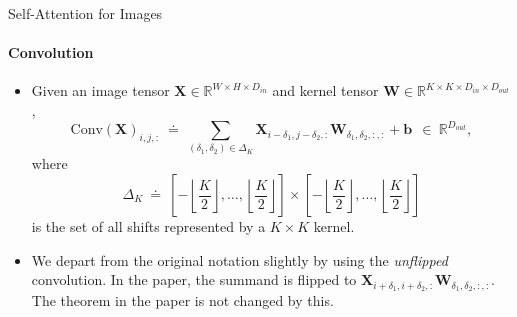 \documentclass[9pt]{beamer}
\newcommand{\bb}{\mathbb}
\newcommand{\mb}{\bm}
\begin{document}
\newcommand{\sqbrkt}[1]{\left[#1\right]}
\newcommand{\ktwo}{\left\lfloor\frac K2\right\rfloor}
\begin{frame}{Self-Attention for Images}
\framesubtitle{Convolution}
\begin{itemize}
\item Given an image tensor $\bm X \in \bb R^{W\times H\times D_{in}}$ and kernel tensor $\bm W \in \bb R^{K\times K \times D_{in} \times D_{out}}$,
\begin{equation}
\mathrm{Conv}(\mb X)_{i,j,:} \ \doteq \ \sum_{(\delta_1, \delta_2) \in \Delta_K} \mb X_{i-\delta_1, j-\delta_2, :} \mb W_{\delta_1, \delta_2, :, :} + \mb b \ \ \in \ \mathbb R^{D_{out}},
\end{equation}
where
$$\Delta_K \ \doteq \ \sqbrkt{-\ktwo, \dots, \ktwo} \times \sqbrkt{-\ktwo, \dots, \ktwo}$$
is the set of all shifts represented by a $K\times K$ kernel.

\vspace{.1in}
\item We depart from the original notation slightly by using the {\em unflipped} convolution. In the paper, the summand is flipped to $\bm X_{i+\delta_1, i+\delta_2,:} \bm W_{\delta_1, \delta_2,:,:}$. The theorem in the paper is not changed by this.
\end{itemize}
\end{frame}
\end{document}
